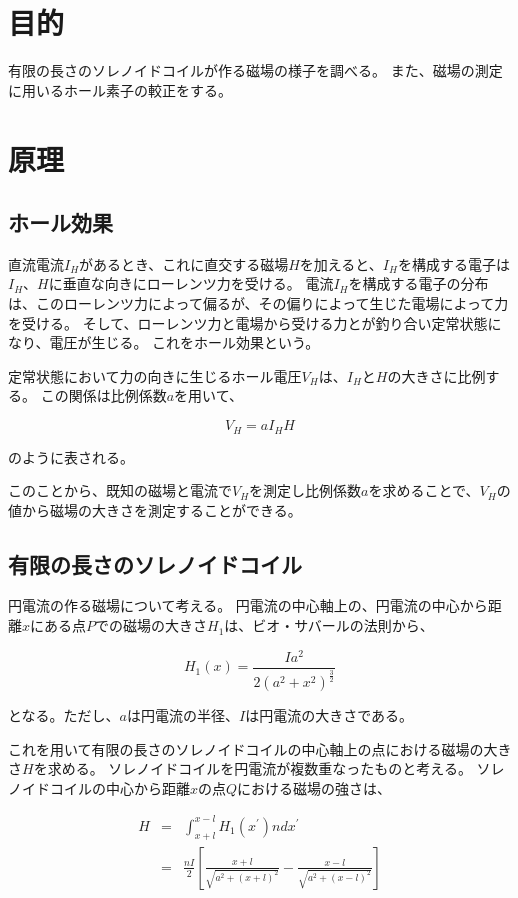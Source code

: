\documentclass[uplatex,11pt]{jsarticle}
\begin{document}
\section{目的}

有限の長さのソレノイドコイルが作る磁場の様子を調べる。
また、磁場の測定に用いるホール素子の較正をする。

\section{原理}

\subsection{ホール効果}

直流電流$I_H$があるとき、これに直交する磁場$H$を加えると、$I_H$を構成する電子は$I_H$、$H$に垂直な向きにローレンツ力を受ける。
電流$I_H$を構成する電子の分布は、このローレンツ力によって偏るが、その偏りによって生じた電場によって力を受ける。
そして、ローレンツ力と電場から受ける力とが釣り合い定常状態になり、電圧が生じる。
これをホール効果という。

定常状態において力の向きに生じるホール電圧$V_H$は、$I_H$と$H$の大きさに比例する。
この関係は比例係数$a$を用いて、

\[
    V_H = a I_H H
\]

のように表される。

このことから、既知の磁場と電流で$V_H$を測定し比例係数$a$を求めることで、$V_H$の値から磁場の大きさを測定することができる。

\subsection{有限の長さのソレノイドコイル}

円電流の作る磁場について考える。
円電流の中心軸上の、円電流の中心から距離$x$にある点$P$での磁場の大きさ$H_1$は、ビオ・サバールの法則から、

\[
    H_1(x) = \frac{Ia^2}{2(a^2+x^2)^\frac{3}{2}}
\]

となる。ただし、$a$は円電流の半径、$I$は円電流の大きさである。

これを用いて有限の長さのソレノイドコイルの中心軸上の点における磁場の大きさ$H$を求める。
ソレノイドコイルを円電流が複数重なったものと考える。
ソレノイドコイルの中心から距離$x$の点$Q$における磁場の強さは、

\begin{eqnarray}
    H & = & \int_{x + l}^{x - l} H_1(x^{\prime}) ndx^{\prime} \\
      & = & \frac{nI}{2} \left[ \frac{x + l}{\sqrt{a^2+(x+l)^2}} - \frac{x - l}{\sqrt{a^2+(x-l)^2}} \right] \label{eq_solenoid_theoretical}
\end{eqnarray}
\end{document}
